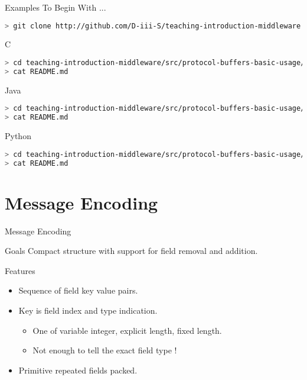 \begin{frame}[fragile]{Examples To Begin With ...}
\begin{lstlisting}[language=bash,style=mini]
> git clone http://github.com/D-iii-S/teaching-introduction-middleware.git
\end{lstlisting}
    \begin{block}{C}
\begin{lstlisting}[language=bash,style=mini]
> cd teaching-introduction-middleware/src/protocol-buffers-basic-usage/c
> cat README.md
\end{lstlisting}
    \end{block}
    \begin{block}{Java}
\begin{lstlisting}[language=bash,style=mini]
> cd teaching-introduction-middleware/src/protocol-buffers-basic-usage/java
> cat README.md
\end{lstlisting}
    \end{block}
    \begin{block}{Python}
\begin{lstlisting}[language=bash,style=mini]
> cd teaching-introduction-middleware/src/protocol-buffers-basic-usage/python
> cat README.md
\end{lstlisting}
    \end{block}
\end{frame}


\section{Message Encoding}


\begin{frame}{Message Encoding}
    \begin{block}{Goals}
        Compact structure with support for field removal and addition.
    \end{block}

    \bigskip

    \begin{block}{Features}
        \begin{itemize}
            \item Sequence of field key value pairs.
            \item Key is field index and type indication.
                \begin{itemize}
                    \item One of variable integer, explicit length, fixed length.
                    \item Not enough to tell the exact field type !
                \end{itemize}
            \item Primitive repeated fields packed.
        \end{itemize}
    \end{block}
\end{frame}


